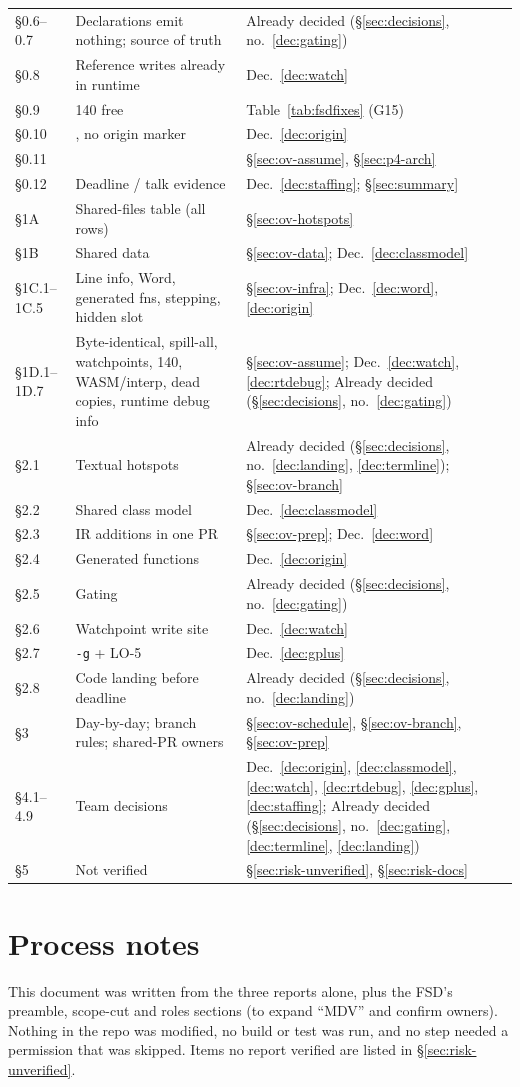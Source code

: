 \documentclass[10pt]{article}
\newcommand{\code}[1]{\texttt{\small #1}}
\newcommand{\decided}[1]{Already decided (\S\ref{sec:decisions}, no.~#1)}
\begin{document}
\begin{xltabular}{\linewidth}{@{}L{2.3cm}Y L{3.6cm}@{}}
§0.6--0.7 & Declarations emit nothing;  source of truth & \decided{\ref{dec:gating}} \\
§0.8 & Reference writes already in runtime & Dec.~\ref{dec:watch} \\
§0.9 & 140 free & Table~\ref{tab:fsdfixes} (G15) \\
§0.10 & , no origin marker & Dec.~\ref{dec:origin} \\
§0.11 &  & \S\ref{sec:ov-assume}, \S\ref{sec:p4-arch} \\
§0.12 & Deadline / talk evidence & Dec.~\ref{dec:staffing}; \S\ref{sec:summary} \\
§1A & Shared-files table (all rows) & \S\ref{sec:ov-hotspots} \\
§1B & Shared data & \S\ref{sec:ov-data}; Dec.~\ref{dec:classmodel} \\
§1C.1--1C.5 & Line info, Word, generated fns, stepping, hidden slot & \S\ref{sec:ov-infra}; Dec.~\ref{dec:word}, \ref{dec:origin} \\
§1D.1--1D.7 & Byte-identical, spill-all, watchpoints, 140, WASM/interp, dead copies, runtime debug info & \S\ref{sec:ov-assume}; Dec.~\ref{dec:watch}, \ref{dec:rtdebug}; \decided{\ref{dec:gating}} \\
§2.1 & Textual hotspots & \decided{\ref{dec:landing}, \ref{dec:termline}}; \S\ref{sec:ov-branch} \\
§2.2 & Shared class model & Dec.~\ref{dec:classmodel} \\
§2.3 & IR additions in one PR & \S\ref{sec:ov-prep}; Dec.~\ref{dec:word} \\
§2.4 & Generated functions & Dec.~\ref{dec:origin} \\
§2.5 & Gating & \decided{\ref{dec:gating}} \\
§2.6 & Watchpoint write site & Dec.~\ref{dec:watch} \\
§2.7 & \code{-g} + LO-5 & Dec.~\ref{dec:gplus} \\
§2.8 & Code landing before deadline & \decided{\ref{dec:landing}} \\
§3 & Day-by-day; branch rules; shared-PR owners & \S\ref{sec:ov-schedule}, \S\ref{sec:ov-branch}, \S\ref{sec:ov-prep} \\
§4.1--4.9 & Team decisions & Dec.~\ref{dec:origin}, \ref{dec:classmodel}, \ref{dec:watch}, \ref{dec:rtdebug}, \ref{dec:gplus}, \ref{dec:staffing}; \decided{\ref{dec:gating}, \ref{dec:termline}, \ref{dec:landing}} \\
§5 & Not verified & \S\ref{sec:risk-unverified}, \S\ref{sec:risk-docs} \\
\bottomrule
\end{xltabular}

\section{Process notes}\label{sec:process}
This document was written from the three reports alone, plus the FSD's preamble, scope-cut and roles sections (to expand ``MDV'' and confirm owners). Nothing in the repo was modified, no build or test was run, and no step needed a permission that was skipped. Items no report verified are listed in \S\ref{sec:risk-unverified}.
\end{document}
